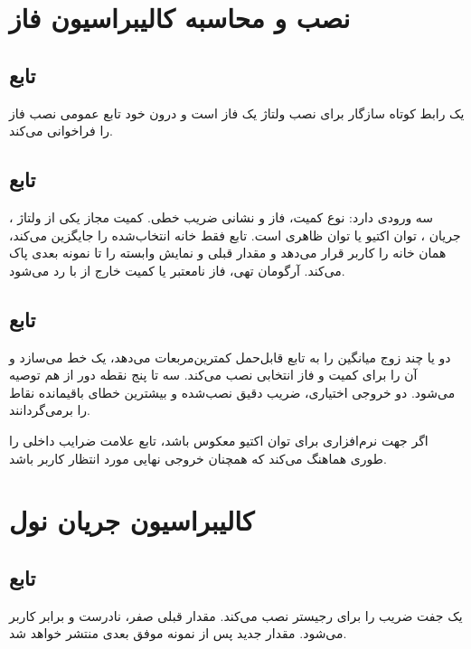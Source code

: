\section{نصب و محاسبه کالیبراسیون فاز}

\subsection{تابع }
یک رابط کوتاه سازگار برای نصب
ولتاژ یک فاز است و درون خود تابع عمومی نصب فاز را فراخوانی می‌کند.

\subsection{تابع }
سه ورودی دارد: نوع کمیت، فاز و نشانی ضریب خطی. کمیت مجاز یکی از ولتاژ ، جریان ، توان اکتیو یا توان ظاهری است. تابع فقط خانه انتخاب‌شده را جایگزین می‌کند،  همان خانه را کاربر قرار می‌دهد و مقدار قبلی و نمایش وابسته را تا نمونه بعدی پاک می‌کند. آرگومان تهی، فاز نامعتبر یا کمیت خارج از  با
رد می‌شود.

\subsection{تابع }
دو یا چند زوج میانگین  را به تابع قابل‌حمل کمترین‌مربعات می‌دهد، یک خط
می‌سازد و آن را برای کمیت و فاز انتخابی نصب می‌کند. سه تا پنج نقطه دور از هم توصیه می‌شود. دو خروجی اختیاری، ضریب دقیق نصب‌شده و بیشترین خطای باقیمانده نقاط را برمی‌گردانند.

اگر جهت نرم‌افزاری  برای توان اکتیو معکوس باشد، تابع علامت ضرایب داخلی را طوری هماهنگ می‌کند که  همچنان خروجی نهایی مورد انتظار کاربر باشد.

\section{کالیبراسیون جریان نول}

\subsection{تابع }
یک جفت ضریب را برای رجیستر
نصب می‌کند. مقدار قبلی صفر،  نادرست و  برابر کاربر می‌شود. مقدار جدید پس از نمونه موفق بعدی منتشر خواهد شد.


